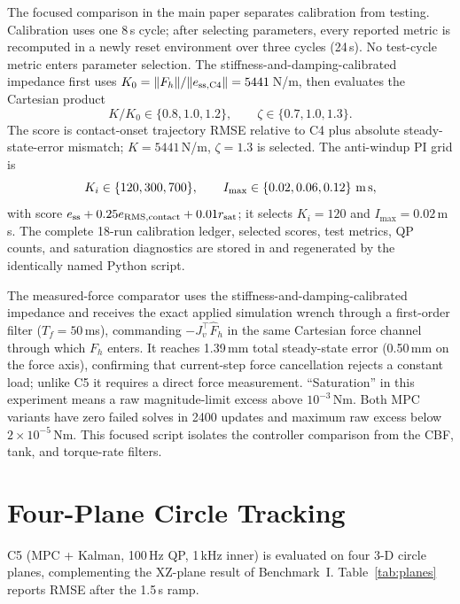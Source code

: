 \documentclass[journal]{IEEEtran}
\begin{document}
The focused comparison in the main paper separates calibration from testing.
Calibration uses one 8\,s cycle; after selecting parameters, every reported
metric is recomputed in a newly reset environment over three cycles (24\,s).
No test-cycle metric enters parameter selection. The
stiffness-and-damping-calibrated impedance first uses $K_0=\|F_h\|/\|e_{\rm ss,C4}\|=5441$\,N/m, then evaluates
the Cartesian product
\[
K/K_0\in\{0.8,1.0,1.2\},\qquad
\zeta\in\{0.7,1.0,1.3\}.
\]
The score is contact-onset trajectory RMSE relative to C4 plus absolute
steady-state-error mismatch; $K=5441$\,N/m, $\zeta=1.3$ is selected. The
anti-windup PI grid is
\[
K_i\in\{120,300,700\},\qquad
I_{\max}\in\{0.02,0.06,0.12\}\ \text{m\,s},
\]
with score $e_{\rm ss}+0.25e_{\rm RMS,contact}+0.01r_{\rm sat}$; it selects
$K_i=120$ and $I_{\max}=0.02$\,m\,s. The complete 18-run calibration ledger,
selected scores, test metrics, QP counts, and saturation diagnostics are stored
in  and regenerated by
the identically named Python script.

The measured-force comparator uses the stiffness-and-damping-calibrated impedance and receives
the exact applied simulation wrench through a first-order filter
($T_f=50$\,ms), commanding $-J_v^\top\hat F_h$ in the same Cartesian force
channel through which $F_h$ enters. It reaches 1.39\,mm total steady-state
error (0.50\,mm on the force axis), confirming that current-step force
cancellation rejects a constant load; unlike C5 it requires a direct
force measurement. ``Saturation'' in this experiment means
a raw magnitude-limit excess above $10^{-3}$\,Nm. Both MPC variants have zero
failed solves in 2400 updates and maximum raw excess below
$2\times10^{-5}$\,Nm. This focused script isolates the controller
comparison from the CBF, tank, and torque-rate filters.

\section{Four-Plane Circle Tracking}\label{sec:planes}

C5 (MPC + Kalman, 100\,Hz QP, 1\,kHz inner) is evaluated on four 3-D
circle planes, complementing the XZ-plane result of Benchmark~I.
Table~\ref{tab:planes} reports RMSE after the 1.5\,s ramp.
\end{document}
